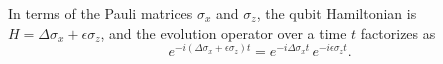 \documentclass{article}
\begin{document}
In terms of the Pauli matrices $\sigma_x$ and $\sigma_z$, the qubit Hamiltonian is
$H = \Delta\sigma_x + \epsilon\sigma_z$, and the evolution operator over a time $t$ factorizes as
\begin{equation}
e^{-i(\Delta\sigma_x + \epsilon\sigma_z)t} = e^{-i\Delta\sigma_x t}\,e^{-i\epsilon\sigma_z t} .
\label{eq:fact}
\end{equation}
\end{document}
